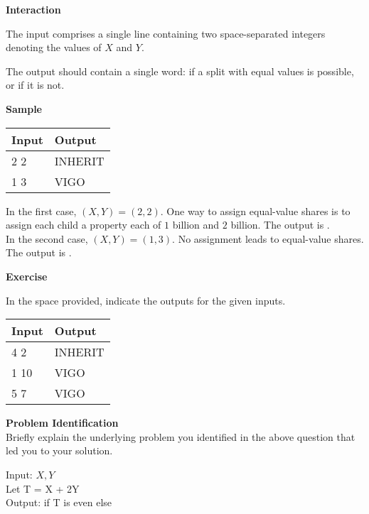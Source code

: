 \documentclass[a4paper]{exam}
\newcommand\heading[1]{\textbf{#1}}
\begin{document}
\begin{questions}
    \heading{Interaction}

    The input comprises a single line containing two space-separated integers denoting the values of $X$ and $Y$.

    The output should contain a single word:  if a split with equal values is possible, or  if it is not.

    \heading{Sample}

    \begin{tabularx}{\textwidth}{|X|X|}
        \rowcolor{gray!50}
        \hline
        Input & Output \\ \hline\hline
        2 2   & INHERIT    \\\hline
        1 3   & VIGO     \\\hline
    \end{tabularx}

    In the first case, $(X,Y)=(2,2)$. One way to assign equal-value shares is to assign each child a property each of $1$ billion and $2$ billion. The output is . \\
    
    In the second case, $(X,Y)=(1,3)$. No assignment leads to equal-value shares. The output is .

    \heading{Exercise}

    In the space provided, indicate the outputs for the given inputs.

    \begin{tabularx}{\textwidth}{|X|X|}
        \rowcolor{gray!50}
        \hline
        Input & Output \\ \hline\hline
        4 2   & INHERIT    \\\hline
        1 10  & VIGO     \\\hline
        5 7   & VIGO     \\\hline
    \end{tabularx}

    \heading{Problem Identification}\\
    Briefly explain the underlying problem you identified in the above question that led you to your solution.

    \begin{mdframed}
        Input: $X,Y$ \\
        Let T = X + 2Y \\
        Output:  if T is even else 
    \end{mdframed}


\end{questions}
\end{document}
